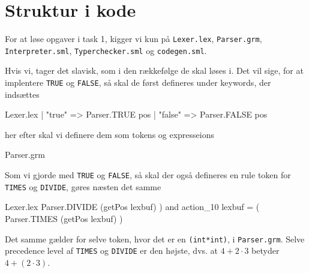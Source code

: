 \documentclass[11pt,a4paper,oneside]{report}
\begin{document}

\setcounter{page}{0}
\renewcommand\thepage{\roman{page}}





\setcounter{page}{1}
\renewcommand\thepage{\arabic{page}}


\section{Struktur i kode}

For at løse opgaver i task 1, kigger vi kun på \texttt{Lexer.lex}, \texttt{Parser.grm}, \texttt{Interpreter.sml}, \texttt{Typerchecker.sml} og \texttt{codegen.sml}.

Hvis vi, tager det slavisk, som i den rækkefølge de skal løses i. Det vil sige, for at implentere \texttt{TRUE} og \texttt{FALSE}, så skal de først defineres under keywords, der indsættes

\begin{code}[firstnumber=42]{Lexer.lex}
       | "true"         => Parser.TRUE pos
       | "false"        => Parser.FALSE pos
\end{code}

her efter skal vi definere dem som tokens og  expresseions

\begin{code}[firstnumber=13]{Parser.grm}
\end{code}

Som vi gjorde med \texttt{TRUE} og \texttt{FALSE}, så skal der også defineres en rule token for \texttt{TIMES} og \texttt{DIVIDE}, gøres næsten det samme

\begin{code}[firstnumber=133]{Lexer.lex}
 Parser.DIVIDE (getPos lexbuf) )
 and action_10 lexbuf = (
 Parser.TIMES  (getPos lexbuf) )
\end{code}

Det samme gælder for selve token, hvor det er en \texttt{(int*int)}, i \texttt{Parser.grm}. Selve precedence level af \texttt{TIMES} og \texttt{DIVIDE} er den højste, dvs. at $4 + 2 \cdot 3$ betyder $4 + (2 \cdot 3)$.
\end{document}
